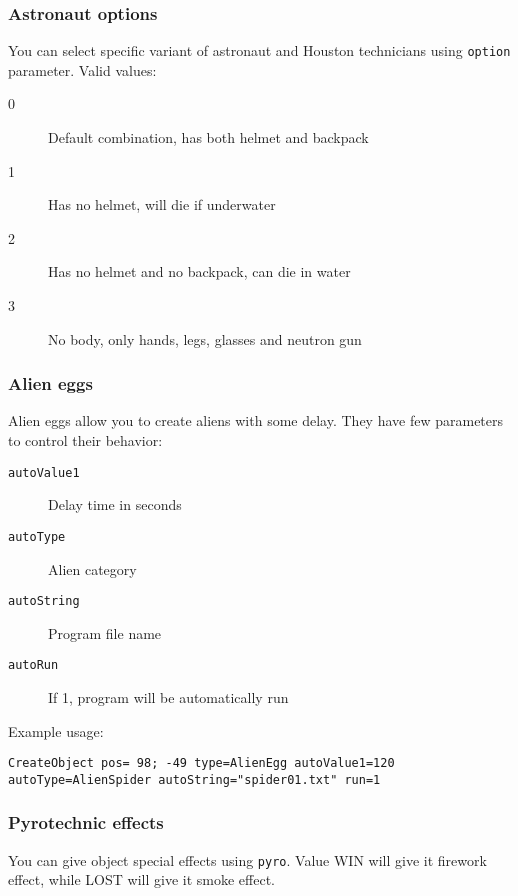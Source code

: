 \subsubsection{Astronaut options}

You can select specific variant of astronaut and Houston technicians using \texttt{option} parameter. Valid values:

\begin{description}
    \item[0] Default combination, has both helmet and backpack
    \item[1] Has no helmet, will die if underwater
    \item[2] Has no helmet and no backpack, can die in water
    \item[3] No body, only hands, legs, glasses and neutron gun
\end{description}


\subsubsection{Alien eggs}

Alien eggs allow you to create aliens with some delay. They have few parameters to control their behavior:

\begin{description}
    \item[\texttt{autoValue1}] Delay time in seconds
    \item[\texttt{autoType}] Alien category
    \item[\texttt{autoString}] Program file name
    \item[\texttt{autoRun}] If 1, program will be automatically run
\end{description}

Example usage:

\begin{lstlisting}[style=scene]
CreateObject pos= 98; -49 type=AlienEgg autoValue1=120 autoType=AlienSpider autoString="spider01.txt" run=1
\end{lstlisting}


\subsubsection{Pyrotechnic effects}

You can give object special effects using \texttt{pyro}. Value WIN will give it firework effect, while LOST will give it smoke effect.

